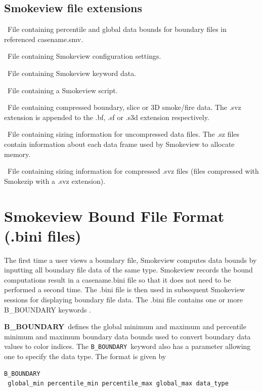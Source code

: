 \documentclass[11pt,twoside]{book}
\newcommand{\parma}{.75}
\newcommand{\parmb}{.5}
\newcommand{\parmc}{0.25}
\newcommand{\blist}{
\begin{list}
{}{
\setlength{\leftmargin}{\parma in}
\setlength{\labelwidth}{\parmb in}
\setlength{\labelsep}{\parmc in}
\setlength{\listparindent}{0.3in}
\setlength{\topsep}{.3in}
\setlength{\parsep}{.0in}
}}
\newcommand{\elist}{\end{list}}
\newcommand{\hitem}[1]{\item[{\bf #1} \hfill]}
\begin{document}
\subsection{Smokeview file extensions}

\blist

\hitem{.bini}\ File containing percentile and global data bounds for
boundary files in referenced casename.smv.

\hitem{.ini}\ File containing Smokeview configuration settings.

\hitem{.smv}\ File containing Smokeview keyword data.

\hitem{.ssf}\ File containing a Smokeview script.

\hitem{.svz}\ File containing compressed boundary, slice or 3D smoke/fire data.
The .svz extension is appended to the .bf, .sf or .s3d extension respectively.

\hitem{.sz}\ File containing sizing information for uncompressed data files.
The .sz files contain information about each data frame used by Smokeview to allocate memory.

\hitem{.szz}\ File containing sizing information for compressed .svz files
(files compressed with Smokezip with a .svz extension).

\elist

\section{Smokeview Bound File Format (.bini files)}
The first time a user views a boundary file, Smokeview computes data bounds by inputting
all boundary file data of the same type.
Smokeview records the bound computations result in a casename.bini file
so that it does not need to be performed a second time.  The .bini file is
then used in subsequent Smokeview sessions for displaying boundary file data.
The .bini file contains one or more B\_BOUNDARY keywords .

{\bf B\_BOUNDARY}\ defines the global minimum and maximum and percentile minimum and
maximum boundary
data bounds used to convert boundary data values to color indices.
The {\tt B\_BOUNDARY}\ keyword also has a parameter allowing
one to specify the data type.  The format is given by
\begin{lstlisting}
B_BOUNDARY
 global_min percentile_min percentile_max global_max data_type
\end{lstlisting}
\end{document}
